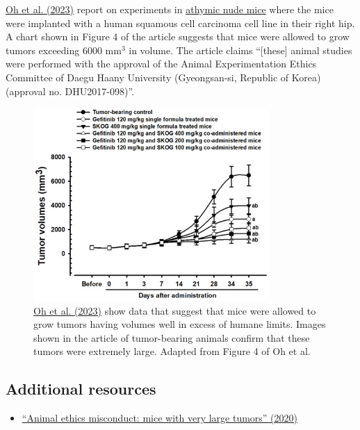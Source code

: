 \documentclass[letterpaper, 12pt]{article}
\begin{document}
\href{https://doi.org/10.3390/app13021090}{Oh et al. (2023)} report on experiments in \href{https://www.jax.org/strain/007850}{athymic nude mice} where the mice were implanted with a human squamous cell carcinoma cell line in their right hip. A chart shown in Figure 4 of the article suggests that mice were allowed to grow tumors exceeding 6000 mm$^3$ in volume. The article claims ``[these] animal studies were performed with the approval of the Animal Experimentation Ethics Committee of Daegu Haany University (Gyeongsan-si, Republic of Korea) (approval no. DHU2017-098)''.

\begin{figure}[h!tbp]
    \centering
    \includegraphics[width=0.8\textwidth]{img/tumor_burden/Screenshot 2025-04-04 at 15-50-26.png}
    \caption*{\href{https://doi.org/10.3390/app13021090}{Oh et al. (2023)} show data that suggest that mice were allowed to grow tumors having volumes well in excess of humane limits. Images shown in the article of tumor-bearing animals confirm that these tumors were extremely large. Adapted from Figure 4 of Oh et al.}
\end{figure}

\subsection*{Additional resources}

\begin{itemize}
    \setlength\itemsep{-0.5em}
    \item \href{https://scienceintegritydigest.com/2020/05/07/animal-ethics-misconduct-mice-with-very-large-tumors/}{``Animal ethics misconduct: mice with very large tumors'' (2020)}
\end{itemize}
\end{document}
